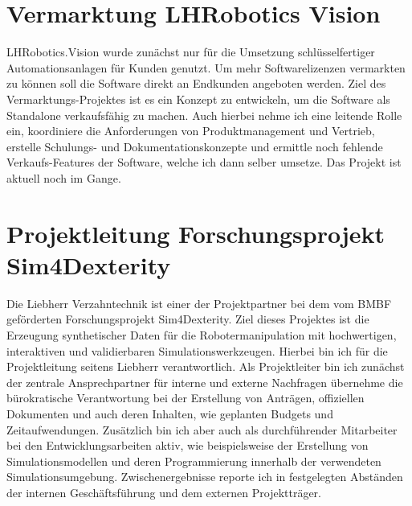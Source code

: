 \documentclass[11pt,a4paper]{moderncv}
\begin{document}
\section{Vermarktung LHRobotics Vision} 
LHRobotics.Vision wurde zunächst nur für die Umsetzung schlüsselfertiger Automationsanlagen für Kunden genutzt. Um mehr Softwarelizenzen vermarkten zu können soll die Software direkt an Endkunden angeboten werden. Ziel des Vermarktungs-Projektes ist es ein Konzept zu entwickeln, um die Software als Standalone verkaufsfähig zu machen. Auch hierbei nehme ich eine leitende Rolle ein, koordiniere die Anforderungen von Produktmanagement und Vertrieb, erstelle Schulungs- und Dokumentationskonzepte und ermittle noch fehlende Verkaufs-Features der Software, welche ich dann selber umsetze. Das Projekt ist aktuell noch im Gange.

\newpage

\section{Projektleitung Forschungsprojekt Sim4Dexterity} 
Die Liebherr Verzahntechnik ist einer der Projektpartner bei dem vom BMBF geförderten Forschungsprojekt Sim4Dexterity. Ziel dieses Projektes ist die Erzeugung synthetischer Daten für die Robotermanipulation mit hochwertigen, interaktiven und validierbaren Simulationswerkzeugen. Hierbei bin ich für die Projektleitung seitens Liebherr verantwortlich. Als Projektleiter bin ich zunächst der zentrale Ansprechpartner für interne und externe Nachfragen übernehme die bürokratische Verantwortung bei der Erstellung von Anträgen, offiziellen Dokumenten und auch deren Inhalten, wie geplanten Budgets und Zeitaufwendungen. Zusätzlich bin ich aber auch als durchführender Mitarbeiter bei den Entwicklungsarbeiten aktiv, wie beispielsweise der Erstellung von Simulationsmodellen und deren Programmierung innerhalb der verwendeten Simulationsumgebung. Zwischenergebnisse reporte ich in festgelegten Abständen der internen Geschäftsführung und dem externen Projektträger.
\end{document}
